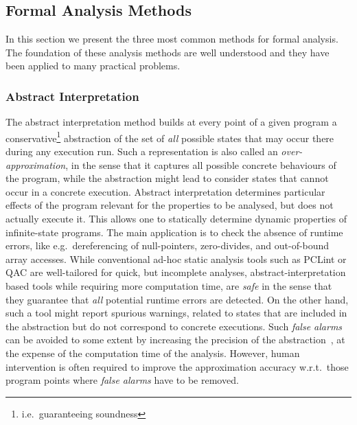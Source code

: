 \documentclass{template/openetcs_report}
\newcommand{\cxx}{C\nolinebreak[4]\hspace{-.05em}\raisebox{.3ex}{\footnotesize\bf ++}\xspace}
\begin{document}
\subsection{Formal Analysis Methods}
\label{sec:formal-analysis}

In this section we present
the three most common methods for formal analysis.
The foundation of these analysis
methods are well understood and they have been
applied to many practical problems.


\subsubsection{Abstract Interpretation}
\label{sec:Abstract Interpretation}

The abstract interpretation method
\cite{Cousot.Cousot.1976}
builds at every point of a given program a conservative\footnote{
        i.e.\ guaranteeing soundness
}
abstraction
of the set of \emph{all} possible states that may occur there
during any execution run. Such a representation is also called an 
\emph{over-approximation}, in the sense that it captures all possible
concrete behaviours of the program, while the abstraction might lead to 
consider states that cannot occur in a concrete execution.
%
Abstract interpretation 
determines particular effects of the program relevant for the
properties to be analysed, but does not actually execute it.
%
This allows one to statically determine dynamic properties of
infinite-state programs.
%
The main application is to check the absence of runtime errors, like
e.g.\ dereferencing of null-pointers, zero-divides,
and out-of-bound array accesses.
%
While conventional ad-hoc static analysis tools such as PCLint or \mbox{QA\cxx}
are well-tailored for quick, but incomplete analyses,
abstract-interpretation based tools while requiring more computation time, are
\emph{safe} in the sense that they guarantee that {\em all} potential
runtime errors are detected. On the other hand, such a tool might report 
spurious warnings, related to states that are included in the abstraction but
do not correspond to concrete executions. Such \emph{false alarms} can be
avoided to some extent by increasing the precision of the 
abstraction~\cite{Souyris.Delmas.2007},
at the expense of the computation time of the analysis. However,
%
human intervention is often required to improve the approximation accuracy
w.r.t.\ those program points where {\em false alarms}
have to be removed.
\end{document}
